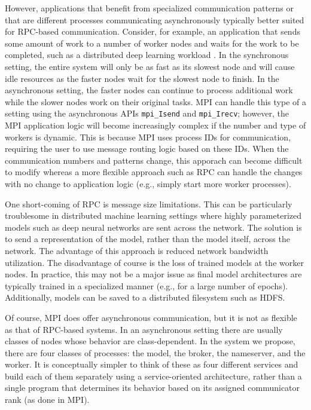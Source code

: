 \documentclass[conference]{IEEEtran}
\begin{document}
However, applications that benefit from specialized communication patterns or
that are different processes communicating asynchronously typically better
suited for RPC-based communication. Consider, for example, an application that
sends some amount of work to a number of worker nodes and waits for the work
to be completed, such as a distributed deep learning workload \cite{40565}. In the
synchronous setting, the entire system will only be as fast as its slowest node
and will cause idle resources as the faster nodes wait for the slowest node to
finish. In the asynchronous setting, the faster nodes can continue to process
additional work while the slower nodes work on their original tasks. MPI can
handle this type of a setting using the asynchronous APIs \texttt{mpi\_Isend}
and \texttt{mpi\_Irecv}; however, the MPI application logic will become increasingly
complex if the number and type of workers is dynamic. This is because MPI uses
process IDs for communication, requiring the user to use message routing logic
based on these IDs. When the communication numbers and patterns change, this
apporach can become difficult to modify whereas a more flexible approach such
as RPC can handle the changes with no change to application logic (e.g., simply
start more worker processes).

One short-coming of RPC is message size limitations. This can be particularly
troublesome in distributed machine learning settings where highly parameterized
models such as deep neural networks are sent across the network. The solution
is to send a representation of the model, rather than the model itself, across
the network. The advantage of this approach is reduced network bandwidth
utilization. The disadvantage of course is the loss of trained models at the
worker nodes. In practice, this may not be a major issue as final model
architectures are typically trained in a specialized manner (e.g., for a large
number of epochs). Additionally, models can be saved to a distributed filesystem
such as HDFS.

Of course, MPI does offer asynchronous communication, but it is not as flexible
as that of RPC-based systems. In an asynchronous setting there are usually
classes of nodes whose behavior are class-dependent. In the system we propose,
there are four classes of processes: the model, the broker, the nameserver, and
the worker. It is conceptually simpler to think of these as four different
services and build each of them separately using a service-oriented
architecture, rather than a single program that determines its behavior based on
its assigned communicator rank (as done in MPI).
\end{document}

